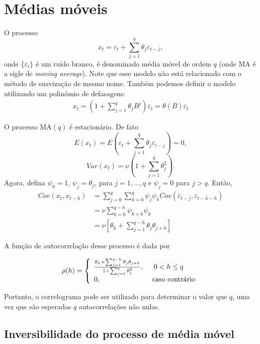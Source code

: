 \documentclass[
  letterpaper,
  DIV=11,
  numbers=noendperiod]{scrartcl}
\theoremstyle{plain}
\theoremstyle{plain}
\theoremstyle{definition}
\theoremstyle{definition}
\theoremstyle{remark}
\begin{document}
\hypertarget{muxe9dias-muxf3veis-1}{%
\section{Médias móveis}\label{muxe9dias-muxf3veis-1}}

O processo
\[  x_t= \varepsilon_t +\sum_{j=1}^{q}\theta_j\varepsilon_{t-j},\] onde
\(\{\varepsilon_t\}\) é um ruído branco, é denominado média móvel de
ordem \(q\) (onde MA é a sigle de \textit{moving average}). Note que
esse modelo não está relacionado com o método de suavização de mesmo
nome. Também podemos definir o modelo utilizando um polinômio de
defasagens: \[\begin{align}x_t
    =\left(1+\sum_{j=1}^{q}\theta_jB^j\right)\varepsilon_t=\theta(B)\varepsilon_t\end{align}\]

O processo MA\((q)\) é estacionário. De fato
\[E(x_t)=E\left(\varepsilon_t +\sum_{j=1}^{q}\theta_j\varepsilon_{t-j}\right)=0,\]
\[Var(x_t)=\nu\left(1+\sum_{j=1}^{q}\theta_j^2\right).\] Agora, defina
\(\psi_0=1\), \(\psi_j=\theta_j\), para \(j=1,\ldots,q\) e \(\psi_j=0\)
para \(j>q\). Então, \[\begin{align}
Cov(x_t,x_{t-h})&=\sum_{j=0}^q\sum_{k=0}^q \psi_j\psi_k Cov\left(\varepsilon_{t-j},\varepsilon_{t-k-h}\right)\\&=\nu\sum_{k=0}^{q-h} \psi_{k+h}\psi_k\\
&=\nu\left[\theta_h+\sum_{j=1}^{q-h}\theta_j\theta_{j+h}\right]\end{align}\]

A função de autocorrelação desse processo é dada por

\[\rho(h)=\left\{\begin{array}{ll}\frac{\theta_h+\sum_{j=1}^{q-h}\theta_j\theta_{j+h}}{1+\sum_{j=1}^q\theta^2_j },&\;\;0<h\leq q\\0,&\hbox{ caso contrário}\end{array}\right.\]

Portanto, o correlograma pode ser utilizado para determinar o valor que
\(q\), uma vez que são esperadas \(q\) autocorrelações não nulas.

\hypertarget{inversibilidade-do-processo-de-muxe9dia-muxf3vel}{%
\subsection{Inversibilidade do processo de média
móvel}\label{inversibilidade-do-processo-de-muxe9dia-muxf3vel}}
\end{document}
